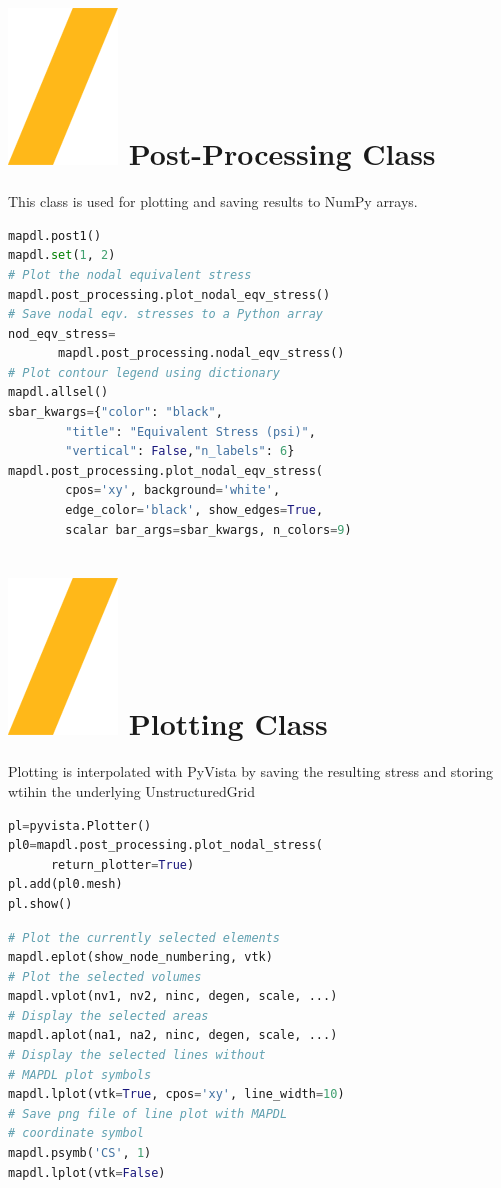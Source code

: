\documentclass[9pt,landscape]{article}
\begin{document}
\begin{multicols}{3}
\columnbreak

\section{\includegraphics[height=\fontcharht\font`\S]{slash.png} Post-Processing Class}
This class is used for plotting and saving results to NumPy arrays.
\begin{lstlisting}[language=Python]
mapdl.post1()
mapdl.set(1, 2)
# Plot the nodal equivalent stress
mapdl.post_processing.plot_nodal_eqv_stress()
# Save nodal eqv. stresses to a Python array
nod_eqv_stress=
       mapdl.post_processing.nodal_eqv_stress()
# Plot contour legend using dictionary
mapdl.allsel()
sbar_kwargs={"color": "black",
        "title": "Equivalent Stress (psi)",
        "vertical": False,"n_labels": 6}
mapdl.post_processing.plot_nodal_eqv_stress(
        cpos='xy', background='white',
        edge_color='black', show_edges=True,
        scalar bar_args=sbar_kwargs, n_colors=9)
\end{lstlisting} 
\vfill
\section{\includegraphics[height=\fontcharht\font`\S]{slash.png} Plotting Class}
Plotting is interpolated with PyVista by saving the resulting stress and storing wtihin the underlying UnstructuredGrid
\begin{lstlisting}[language=Python]
pl=pyvista.Plotter()
pl0=mapdl.post_processing.plot_nodal_stress(
      return_plotter=True)
pl.add(pl0.mesh)
pl.show()
\end{lstlisting} 
\begin{lstlisting}[language=Python]
# Plot the currently selected elements
mapdl.eplot(show_node_numbering, vtk)
# Plot the selected volumes
mapdl.vplot(nv1, nv2, ninc, degen, scale, ...)
# Display the selected areas
mapdl.aplot(na1, na2, ninc, degen, scale, ...)
# Display the selected lines without 
# MAPDL plot symbols
mapdl.lplot(vtk=True, cpos='xy', line_width=10)
# Save png file of line plot with MAPDL 
# coordinate symbol
mapdl.psymb('CS', 1)
mapdl.lplot(vtk=False)
\end{lstlisting} 
\vfill


\end{multicols}
\end{document}
